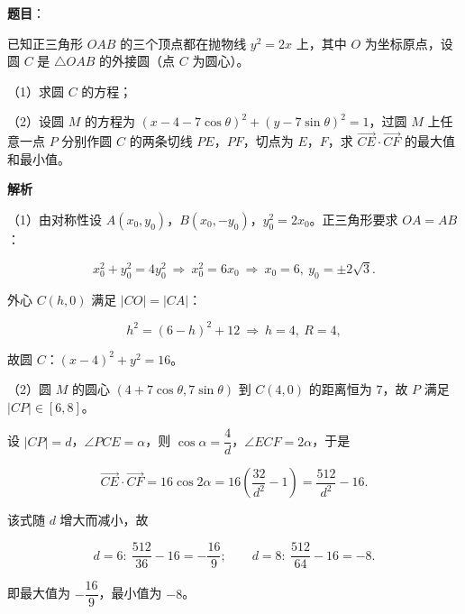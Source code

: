 \begin{answer}

\textbf{题目}：

已知正三角形 $OAB$ 的三个顶点都在抛物线 $y^2=2x$ 上，其中 $O$ 为坐标原点，设圆 $C$ 是 $\triangle OAB$ 的外接圆（点 $C$ 为圆心）。

（1）求圆 $C$ 的方程；

（2）设圆 $M$ 的方程为 $(x-4-7\cos\theta)^2+(y-7\sin\theta)^2=1$，过圆 $M$ 上任意一点 $P$ 分别作圆 $C$ 的两条切线 $PE$，$PF$，切点为 $E$，$F$，求 $\overrightarrow{CE}\cdot\overrightarrow{CF}$ 的最大值和最小值。

\textbf{解析}

（1）由对称性设 $A(x_0,y_0)$，$B(x_0,-y_0)$，$y_0^2=2x_0$。正三角形要求 $OA=AB$：

\nopagebreak[4]
\[x_0^2+y_0^2=4y_0^2\ \Rightarrow\ x_0^2=6x_0\ \Rightarrow\ x_0=6,\ y_0=\pm2\sqrt3.\]

外心 $C(h,0)$ 满足 $|CO|=|CA|$：

\nopagebreak[4]
\[h^2=(6-h)^2+12\ \Rightarrow\ h=4,\ R=4,\]

故圆 $C$：$(x-4)^2+y^2=16$。

（2）圆 $M$ 的圆心 $(4+7\cos\theta,7\sin\theta)$ 到 $C(4,0)$ 的距离恒为 $7$，故 $P$ 满足 $|CP|\in[6,8]$。

设 $|CP|=d$，$\angle PCE=\alpha$，则 $\cos\alpha=\dfrac4d$，$\angle ECF=2\alpha$，于是

\nopagebreak[4]
\[\overrightarrow{CE}\cdot\overrightarrow{CF}=16\cos2\alpha=16\left(\frac{32}{d^2}-1\right)=\frac{512}{d^2}-16.\]

该式随 $d$ 增大而减小，故

\nopagebreak[4]
\[d=6:\ \frac{512}{36}-16=-\frac{16}9;\qquad d=8:\ \frac{512}{64}-16=-8.\]

即最大值为 $-\dfrac{16}9$，最小值为 $-8$。


\end{answer}
